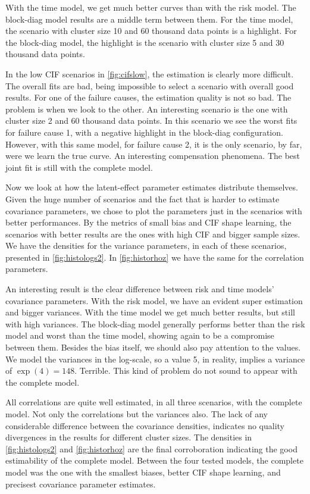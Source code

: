 With the time model, we get much better curves than with the risk
model. The block-diag model results are a middle term between them. For
the time model, the scenario with cluster size 10 and 60 thousand data
points is a highlight. For the block-diag model, the highlight is the
scenario with cluster size 5 and 30 thousand data points.

In the low CIF scenarios in \autoref{fig:cifslow}, the estimation is
clearly more difficult. The overall fits are bad, being impossible to
select a scenario with overall good results. For one of the failure
causes, the estimation quality is not so bad. The problem is when we
look to the other. An interesting scenario is the one with cluster size
2 and 60 thousand data points. In this scenario we see the worst fits
for failure cause 1, with a negative highlight in the block-diag
configuration. However, with this same model, for failure cause 2, it is
the only scenario, by far, were we learn the true curve. An interesting
compensation phenomena. The best joint fit is still with the complete
model.

Now we look at how the latent-effect parameter estimates distribute
themselves. Given the huge number of scenarios and the fact that is
harder to estimate covariance parameters, we chose to plot the
parameters just in the scenarios with better performances. By the
metrics of small bias and CIF shape learning, the scenarios with better
results are the ones with high CIF and bigger sample sizes. We have the
densities for the variance parameters, in each of these scenarios,
presented in \autoref{fig:histologs2}. In \autoref{fig:historhoz} we
have the same for the correlation parameters.

An interesting result is the clear difference between risk and time
models' covariance parameters. With the risk model, we have an evident
super estimation and bigger variances. With the time model we get much
better results, but still with high variances. The block-diag model
generally performs better than the risk model and worst than the time
model, showing again to be a compromise between them. Besides the bias
itself, we should also pay attention to the values. We model the
variances in the log-scale, so a value 5, in reality, implies a variance
of \(\exp(4) = 148\). Terrible. This kind of problem do not sound to
appear with the complete model.

All correlations are quite well estimated, in all three scenarios, with
the complete model. Not only the correlations but the variances
also. The lack of any considerable difference between the covariance
densities, indicates no quality divergences in the results for different
cluster sizes. The densities in \autoref{fig:histologs2} and
\autoref{fig:historhoz} are the final corroboration indicating the good
estimability of the complete model. Between the four tested models, the
complete model was the one with the smallest biases, better CIF shape
learning, and precisest covariance parameter estimates.

